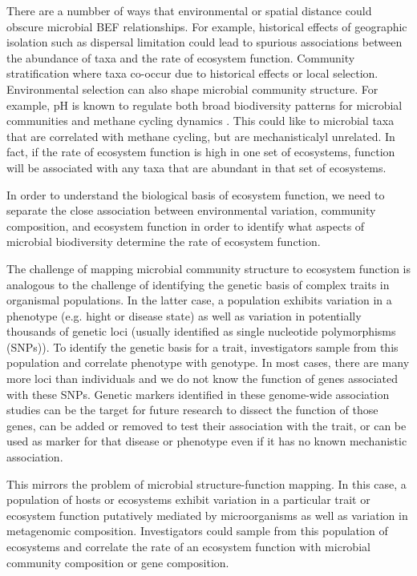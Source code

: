 \documentclass{article}
\begin{document}
There are a numbber of ways that environmental or spatial distance could obscure
microbial BEF relationships. For example, historical effects of geographic
isolation such as dispersal limitation could lead to spurious associations
between the abundance of taxa and the rate of ecosystem function. Community
stratification where taxa co-occur due to historical effects or local selection.
Environmental selection can also shape microbial community
structure. For example, pH is known to regulate both broad biodiversity patterns for
microbial communities \citep{fierer2006} and methane cycling dynamics
\citep{ye2012}. This could like to microbial taxa that are correlated with
methane cycling, but are mechanisticalyl unrelated. In fact, if the rate of
ecosystem function is high in one set of ecosystems, function will be
associated with any taxa that are abundant in that set of
ecosystems. 

In order to understand the biological basis of ecosystem function, we need to
separate the close association between environmental variation, community
composition, and ecosystem function in order to identify what aspects of
microbial biodiversity determine the rate of ecosystem function.

The challenge of mapping microbial community structure to ecosystem function is
analogous to the challenge of identifying the genetic basis of complex traits in
organismal populations. In the latter case, a population exhibits variation in a
phenotype (e.g. hight or disease state) as well as variation in potentially
thousands of genetic loci (usually identified as single nucleotide polymorphisms
(SNPs)). To identify the genetic basis for a trait, investigators sample from
this population and correlate phenotype with genotype. In most cases, there are
many more loci than individuals and we do not know the function of genes
associated with these SNPs. Genetic markers identified in these genome-wide association
studies can be the target for future research to dissect the function of those
genes, can be added or removed to test their association with the trait, or can
be used as marker for that disease or phenotype even if it has no known
mechanistic association.

This mirrors the problem of microbial
structure-function mapping. In this case, a population of hosts or ecosystems exhibit
variation in a particular trait or ecosystem function putatively mediated by
microorganisms as well as variation in metagenomic composition. Investigators
could sample from this population of ecosystems and correlate the rate of an
ecosystem function with microbial community composition or gene composition. 
\end{document}
